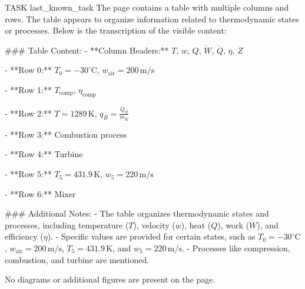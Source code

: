 TASK {last_known_task}  
The page contains a table with multiple columns and rows. The table appears to organize information related to thermodynamic states or processes. Below is the transcription of the visible content:

### Table Content:
- **Column Headers:**  
  \( T \), \( w \), \( Q \), \( \dot{W} \), \( \dot{Q} \), \( \eta \), \( Z \)

- **Row 0:**  
  \( T_0 = -30^\circ\text{C} \), \( w_{\text{air}} = 200 \, \text{m/s} \)

- **Row 1:**  
  \( T_{\text{comp}} \), \( \eta_{\text{comp}} \)

- **Row 2:**  
  \( T = 1289 \, \text{K} \), \( q_B = \frac{\dot{Q}_B}{\dot{m}_K} \)

- **Row 3:**  
  Combustion process

- **Row 4:**  
  Turbine

- **Row 5:**  
  \( T_5 = 431.9 \, \text{K} \), \( w_5 = 220 \, \text{m/s} \)

- **Row 6:**  
  Mixer

### Additional Notes:
- The table organizes thermodynamic states and processes, including temperature (\( T \)), velocity (\( w \)), heat (\( Q \)), work (\( \dot{W} \)), and efficiency (\( \eta \)).
- Specific values are provided for certain states, such as \( T_0 = -30^\circ\text{C} \), \( w_{\text{air}} = 200 \, \text{m/s} \), \( T_5 = 431.9 \, \text{K} \), and \( w_5 = 220 \, \text{m/s} \).
- Processes like compression, combustion, and turbine are mentioned.

No diagrams or additional figures are present on the page.